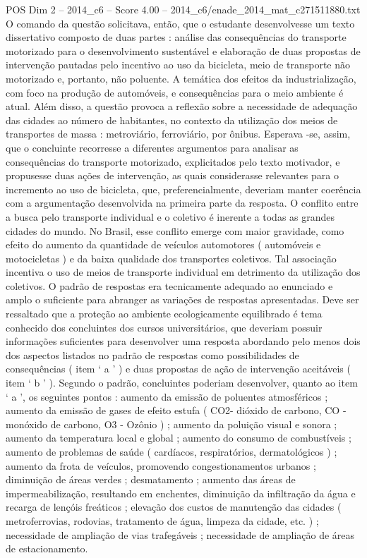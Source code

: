 \begin{textsample}{POS Dim 2 – 2014\_c6 – Score 4.00 – 2014\_c6/enade\_2014\_mat\_c271511880.txt}
O comando da questão solicitava, então, que o estudante desenvolvesse um texto dissertativo composto de duas partes : análise das consequências do transporte motorizado para o desenvolvimento sustentável e elaboração de duas propostas de intervenção pautadas pelo incentivo ao uso da bicicleta, meio de transporte não motorizado e, portanto, não poluente.
A temática dos efeitos da industrialização, com foco na produção de automóveis, e consequências para o meio ambiente é atual.
Além disso, a questão provoca a reflexão sobre a necessidade de adequação das cidades ao número de habitantes, no contexto da utilização dos meios de transportes de massa : metroviário, ferroviário, por ônibus.
Esperava -se, assim, que o concluinte recorresse a diferentes argumentos para analisar as consequências do transporte motorizado, explicitados pelo texto motivador, e propusesse duas ações de intervenção, as quais considerasse relevantes para o incremento ao uso de bicicleta, que, preferencialmente, deveriam manter coerência com a argumentação desenvolvida na primeira parte da resposta.
O conflito entre a busca pelo transporte individual e o coletivo é inerente a todas as grandes cidades do mundo.
No Brasil, esse conflito emerge com maior gravidade, como efeito do aumento da quantidade de veículos automotores ( automóveis e motocicletas ) e da baixa qualidade dos transportes coletivos.
Tal associação incentiva o uso de meios de transporte individual em detrimento da utilização dos coletivos.
O padrão de respostas era tecnicamente adequado ao enunciado e amplo o suficiente para abranger as variações de respostas apresentadas.
Deve ser ressaltado que a proteção ao ambiente ecologicamente equilibrado é tema conhecido dos concluintes dos cursos universitários, que deveriam possuir informações suficientes para desenvolver uma resposta abordando pelo menos dois dos aspectos listados no padrão de respostas como possibilidades de consequências ( item ‘ a ’ ) e duas propostas de ação de intervenção aceitáveis ( item ‘ b ’ ).
Segundo o padrão, concluintes poderiam desenvolver, quanto ao item ‘ a ’, os seguintes pontos : aumento da emissão de poluentes atmosféricos ; aumento da emissão de gases de efeito estufa ( CO2- dióxido de carbono, CO - monóxido de carbono, O3 - Ozônio ) ; aumento da poluição visual e sonora ; aumento da temperatura local e global ; aumento do consumo de combustíveis ; aumento de problemas de saúde ( cardíacos, respiratórios, dermatológicos ) ; aumento da frota de veículos, promovendo congestionamentos urbanos ; diminuição de áreas verdes ; desmatamento ; aumento das áreas de impermeabilização, resultando em enchentes, diminuição da infiltração da água e recarga de lençóis freáticos ; elevação dos custos de manutenção das cidades ( metroferrovias, rodovias, tratamento de água, limpeza da cidade, etc. ) ; necessidade de ampliação de vias trafegáveis ; necessidade de ampliação de áreas de estacionamento.

\end{textsample}
